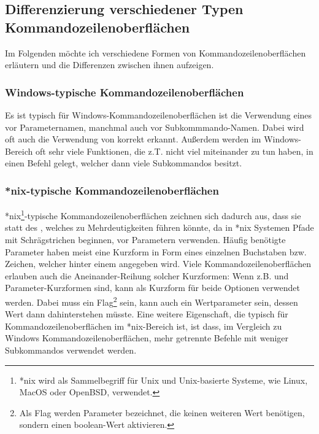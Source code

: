 \subsection{Differenzierung verschiedener Typen Kommandozeilenoberflächen}\label{subsec:DifferentCLITypes}
Im Folgenden möchte ich verschiedene Formen von Kommandozeilenoberflächen erläutern und die Differenzen zwischen ihnen aufzeigen.
\subsubsection{Windows-typische Kommandozeilenoberflächen}
Es ist typisch für Windows-Kommandozeilenoberflächen ist die Verwendung eines \inlinecode{/} vor Parameternamen, manchmal auch vor Subkommmando-Namen.
Dabei wird oft auch die Verwendung von \inlinecode{-} korrekt erkannt.
Außerdem werden im Windows-Bereich oft sehr viele Funktionen, die z.T. nicht viel miteinander zu tun haben, in einen Befehl gelegt, welcher dann viele Subkommandos besitzt.
\subsubsection{*nix-typische Kommandozeilenoberflächen}
*nix\footnote{*nix wird als Sammelbegriff für Unix und Unix-basierte Systeme, wie Linux, MacOS oder OpenBSD, verwendet.}-typische Kommandozeilenoberflächen
zeichnen sich dadurch aus, dass sie statt des \inlinecode{/}, welches zu Mehrdeutigkeiten führen könnte, da in *nix Systemen Pfade mit Schrägstrichen beginnen, vor Parametern \inlinecode{--} verwenden.
Häufig benötigte Parameter haben meist eine Kurzform in Form eines einzelnen Buchstaben bzw. Zeichen, welcher hinter einem \inlinecode{-} angegeben wird.
Viele Kommandozeilenoberflächen erlauben auch die Aneinander-Reihung solcher Kurzformen:
Wenn z.B.  und  Parameter-Kurzformen sind, kann  als Kurzform für beide Optionen verwendet werden.
Dabei muss  ein Flag\footnote{Als Flag werden Parameter bezeichnet, die keinen weiteren Wert benötigen, sondern einen boolean-Wert aktivieren.} sein,
 kann auch ein Wertparameter sein, dessen Wert dann dahinterstehen müsste.
Eine weitere Eigenschaft, die typisch für Kommandozeilenoberflächen im *nix-Bereich ist, ist dass,
im Vergleich zu Windows Kommandozeilenoberflächen, mehr getrennte Befehle mit weniger Subkommandos verwendet werden.
